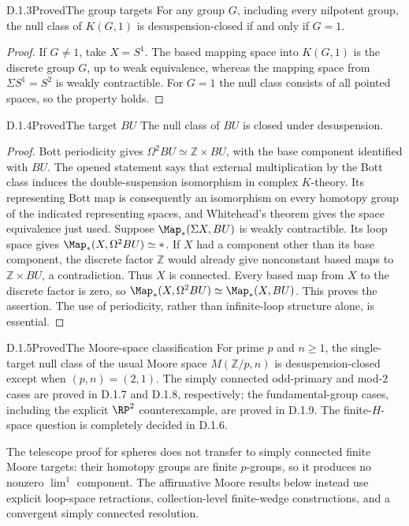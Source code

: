 \begin{claim}{D.1.3}{Proved}{The group targets}
For any group $G$, including every nilpotent group, the null class of $K(G,1)$ is desuspension-closed if and only if $G=1$.
\end{claim}
\begin{proof}
If $G\neq1$, take $X=S^1$. The based mapping space into $K(G,1)$ is the discrete group $G$, up to weak equivalence, whereas the mapping space from $\Sigma S^1=S^2$ is weakly contractible. For $G=1$ the null class consists of all pointed spaces, so the property holds.
\end{proof}

\begin{claim}{D.1.4}{Proved}{The target $BU$}
The null class of $BU$ is closed under desuspension.
\end{claim}
\begin{proof}
Bott periodicity gives $\Omega^2BU\simeq\mathbb Z\times BU$, with the base component identified with $BU$. The opened statement \cite[Theorem 2.11]{HatcherVB} says that external multiplication by the Bott class induces the double-suspension isomorphism in complex $K$-theory. Its representing Bott map is consequently an isomorphism on every homotopy group of the indicated representing spaces, and Whitehead's theorem gives the space equivalence just used. Suppose $\Map_*(\Sigma X,BU)$ is weakly contractible. Its loop space gives $\Map_*(X,\Omega^2BU)\simeq *$. If $X$ had a component other than its base component, the discrete factor $\mathbb Z$ would already give nonconstant based maps to $\mathbb Z\times BU$, a contradiction. Thus $X$ is connected. Every based map from $X$ to the discrete factor is zero, so $\Map_*(X,\Omega^2BU)\simeq\Map_*(X,BU)$. This proves the assertion. The use of periodicity, rather than infinite-loop structure alone, is essential.
\end{proof}

\begin{claim}{D.1.5}{Proved}{The Moore-space classification}
For prime $p$ and $n\geq1$, the single-target null class of the usual Moore space $M(\mathbb Z/p,n)$ is desuspension-closed except when $(p,n)=(2,1)$. The simply connected odd-primary and mod-$2$ cases are proved in D.1.7 and D.1.8, respectively; the fundamental-group cases, including the explicit $\RP^2$ counterexample, are proved in D.1.9. The finite-$H$-space question is completely decided in D.1.6.
\end{claim}
The telescope proof for spheres does not transfer to simply connected finite Moore targets: their homotopy groups are finite $p$-groups, so it produces no nonzero $\lim^1$ component. The affirmative Moore results below instead use explicit loop-space retractions, collection-level finite-wedge constructions, and a convergent simply connected resolution.

